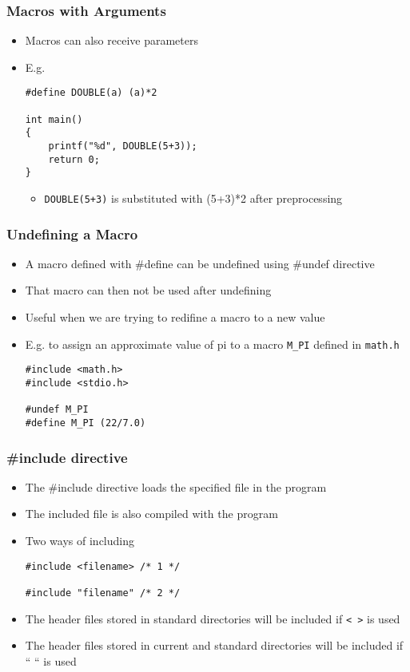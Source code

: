\documentclass[11pt]{beamer}
\begin{document}
\begin{frame}[fragile]\frametitle{Macros with Arguments}
\label{sec-1-19}

\begin{itemize}
\item Macros can also receive parameters
\item E.g.

\begin{verbatim}
#define DOUBLE(a) (a)*2

int main()
{
    printf("%d", DOUBLE(5+3));
    return 0;
}
\end{verbatim}
\begin{itemize}
\item \verb~DOUBLE(5+3)~ is substituted with (5+3)*2 after preprocessing
\end{itemize}
\end{itemize}
\end{frame}
\begin{frame}[fragile]\frametitle{Undefining a Macro}
\label{sec-1-20}

\begin{itemize}
\item A macro defined with \#define can be undefined using \#undef directive
\item That macro can then not be used after undefining
\item Useful when we are trying to redifine a macro to a new value
\item E.g. to assign an approximate value of pi to a macro \verb~M_PI~ defined in \verb~math.h~

\begin{verbatim}
#include <math.h>
#include <stdio.h>

#undef M_PI
#define M_PI (22/7.0)
\end{verbatim}
\end{itemize}
\end{frame}
\begin{frame}[fragile]\frametitle{\#include directive}
\label{sec-1-21}

\begin{itemize}
\item The \#include directive loads the specified file in the program
\item The included file is also compiled with the program
\item Two ways of including

\begin{verbatim}
#include <filename> /* 1 */

#include "filename" /* 2 */
\end{verbatim}
\item The header files  stored in standard directories will be included if \verb~< >~ is used
\item The header files stored in current and standard directories will be included if `` `` is used
\end{itemize}
\end{frame}
\end{document}
